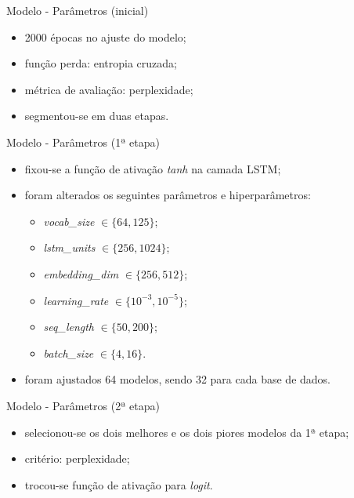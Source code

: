 \documentclass{beamer}
\begin{document}
    \begin{frame}{Modelo - Parâmetros (inicial)}
        \begin{itemize}
            \justifying
            \item 2000 épocas no ajuste do modelo;
            \item função perda: entropia cruzada;
            \item métrica de avaliação: perplexidade;
            \item segmentou-se em duas etapas.
        \end{itemize}
    \end{frame}
    
    \begin{frame}{Modelo - Parâmetros (1ª etapa)}
        \begin{itemize}
            \justifying
            \item fixou-se a função de ativação \textit{tanh} na camada LSTM;
            \item foram alterados os seguintes parâmetros e hiperparâmetros:
            \begin{itemize}
                \item \textit{vocab\_size} $\in \{64,125\}$;
                \item \textit{lstm\_units} $\in \{256,1024\}$;
                \item \textit{embedding\_dim} $\in \{256,512\}$;
                \item \textit{learning\_rate} $\in \{10^{-3},10^{-5}\}$;
                \item \textit{seq\_length} $\in \{50,200\}$;
                \item \textit{batch\_size} $\in \{4,16\}$.
            \end{itemize}
            \item foram ajustados 64 modelos, sendo 32 para cada base de dados.
        \end{itemize}
    \end{frame}
    
    \begin{frame}{Modelo - Parâmetros (2ª etapa)}
        \begin{itemize}
            \justifying
            \item selecionou-se os dois melhores e os dois piores modelos da 1ª etapa;
            \item critério: perplexidade;
            \item trocou-se função de ativação para \textit{logit}.
        \end{itemize}
    \end{frame}
    
\end{document}
